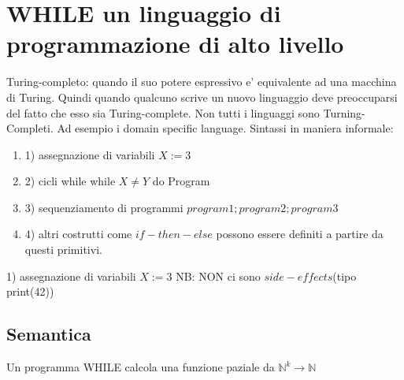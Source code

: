 \documentclass[a4paper, 12pt]{article}
\begin{document}
\section{WHILE un linguaggio di programmazione di alto livello	}
Turing-completo: quando il suo potere espressivo e' equivalente ad una macchina di Turing. 
Quindi quando qualcuno scrive un nuovo linguaggio deve preoccuparsi del fatto che esso sia Turing-complete.
Non tutti i linguaggi sono Turning-Completi. Ad esempio i domain specific language.
Sintassi in maniera informale:
\begin{enumerate}
\item 1) assegnazione di variabili $X:=3$
\item 2) cicli while   while $X \neq Y$ do Program
\item 3) sequenziamento di programmi  $program1; program2; program3$
\item 4) altri costrutti come $if-then-else$ possono essere definiti a partire da questi primitivi.
\end{enumerate}  1) assegnazione di variabili $X:=3$
NB: NON ci sono $side-effects$(tipo print(42))
\subsection{Semantica}
Un programma WHILE calcola una funzione paziale da $\mathbb{N}^{k} \rightarrow \mathbb{N}$ 
\end{document}

